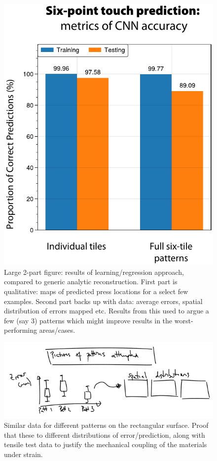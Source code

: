 \begin{figure}[htbp]
  \centering
  \includegraphics[width=0.9\columnwidth]{Images/Figure-5.pdf}
  \caption{Large 2-part figure: results of learning/regression approach, compared to generic analytic reconstruction. First part is qualitative: maps of predicted press locations for a select few examples. Second part backs up with data: average errors, spatial distribution of errors mapped etc. Results from this used to argue a few (say 3) patterns which might improve results in the worst-performing areas/cases.}
  \label{fig:processed}
\end{figure}

\begin{figure}[htbp]
  \centering
  \includegraphics[width=0.9\columnwidth]{Images/filler4.png}
  \caption{Similar data for different patterns on the rectangular surface. Proof that these to different distributions of error/prediction, along with tensile test data to justify the mechanical coupling of the materials under strain.}
  \label{fig:patterns}
\end{figure}


